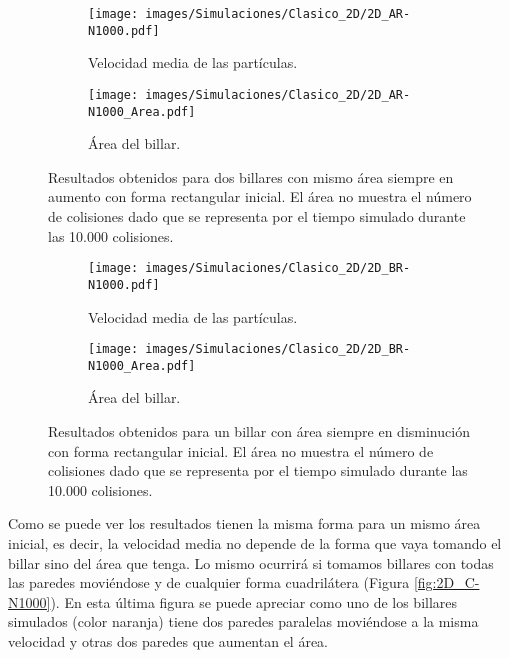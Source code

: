 \vspace{3mm}

\begin{figure}[h!]
    \begin{subfigure}[b]{0.5\textwidth}
        \centering
        \texttt{[image: images/Simulaciones/Clasico\_2D/2D\_AR-N1000.pdf]}
        \caption{Velocidad media de las partículas.}
    \end{subfigure}
    \hfill
    \begin{subfigure}[b]{0.5\textwidth}
        \centering
        \texttt{[image: images/Simulaciones/Clasico\_2D/2D\_AR-N1000\_Area.pdf]}
        \caption{Área del billar.}
    \end{subfigure}
    \caption{Resultados obtenidos para dos billares con mismo área siempre en aumento con forma rectangular inicial. El área no muestra el número de colisiones dado que se representa por el tiempo simulado durante las 10.000 colisiones.}
    \label{fig:2D_AR-N1000_con_Area}
\end{figure}

\begin{figure}[!h]
    \begin{subfigure}[b]{0.5\textwidth}
        \centering
        \texttt{[image: images/Simulaciones/Clasico\_2D/2D\_BR-N1000.pdf]}
        \caption{Velocidad media de las partículas.}
    \end{subfigure}
    \hfill
    \begin{subfigure}[b]{0.5\textwidth}
        \centering
        \texttt{[image: images/Simulaciones/Clasico\_2D/2D\_BR-N1000\_Area.pdf]}
        \caption{Área del billar.}
    \end{subfigure}
    \caption{Resultados obtenidos para un billar con área siempre en disminución con forma rectangular inicial. El área no muestra el número de colisiones dado que se representa por el tiempo simulado durante las 10.000 colisiones.}
    \label{fig:2D_BR-N1000_con_Area}
\end{figure}

Como se puede ver los resultados tienen la misma forma para un mismo área inicial, es decir, la velocidad media no depende de la forma que vaya tomando el billar sino del área que tenga. Lo mismo ocurrirá si tomamos billares con todas las paredes moviéndose y de cualquier forma cuadrilátera (Figura \ref{fig:2D_C-N1000}). En esta última figura se puede apreciar como uno de los billares simulados (color naranja) tiene dos paredes paralelas moviéndose a la misma velocidad y otras dos paredes que aumentan el área. 

